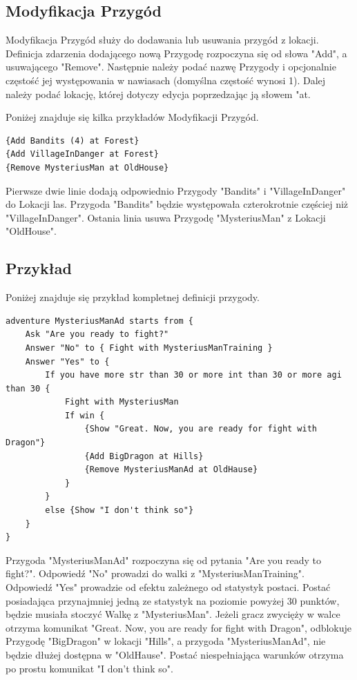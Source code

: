 \documentclass	{xmgr}
\begin{document}
\subsection*{Modyfikacja Przygód}
Modyfikacja Przygód służy do dodawania lub usuwania przygód z lokacji. 
Definicja zdarzenia dodającego nową Przygodę rozpoczyna się od słowa "Add", a usuwającego "Remove". Następnie należy podać nazwę Przygody i opcjonalnie częstość jej występowania w nawiasach (domyślna częstość wynosi 1). Dalej należy podać lokację, której dotyczy edycja poprzedzając ją słowem "at.

Poniżej znajduje się kilka przykładów Modyfikacji Przygód. 
\begin{lstlisting}
{Add Bandits (4) at Forest}
{Add VillageInDanger at Forest}
{Remove MysteriusMan at OldHouse}
\end{lstlisting}
Pierwsze dwie linie dodają odpowiednio Przygody "Bandits" i "VillageInDanger" do Lokacji las. Przygoda "Bandits" będzie występowała czterokrotnie częściej niż "VillageInDanger". Ostania linia usuwa Przygodę "MysteriusMan" z Lokacji "OldHouse".

\subsection*{Przykład}
Poniżej znajduje się przykład kompletnej definicji przygody.
\begin{lstlisting}
adventure MysteriusManAd starts from {
	Ask "Are you ready to fight?"
	Answer "No" to { Fight with MysteriusManTraining }
	Answer "Yes" to {
		If you have more str than 30 or more int than 30 or more agi than 30 {
			Fight with MysteriusMan
			If win {
				{Show "Great. Now, you are ready for fight with Dragon"}
				{Add BigDragon at Hills}
				{Remove MysteriusManAd at OldHause}
			}
		}
		else {Show "I don't think so"}
	}
}
\end{lstlisting}
Przygoda "MysteriusManAd" rozpoczyna się od pytania "Are you ready to fight?". Odpowiedź "No" prowadzi do walki z "MysteriusManTraining".
Odpowiedź "Yes" prowadzie od efektu zależnego od statystyk postaci. Postać posiadająca przynajmniej jedną ze statystyk na poziomie powyżej 30 punktów, będzie musiała stoczyć Walkę z "MysteriusMan". Jeżeli gracz zwycięży w walce otrzyma komunikat "Great. Now, you are ready for fight with Dragon", odblokuje Przygodę "BigDragon" w lokacji "Hills", a przygoda "MysteriusManAd", nie będzie dłużej dostępna w "OldHause". Postać niespełniająca warunków otrzyma po prostu komunikat "I don't think so". 
\end{document}
